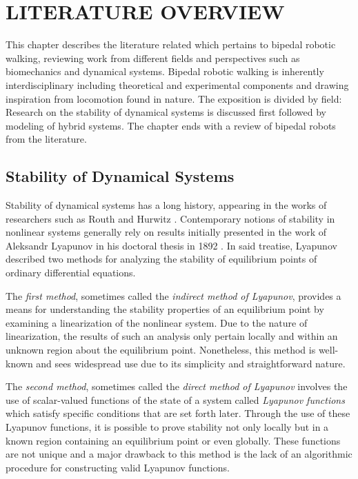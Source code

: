 \chapter{\uppercase{Literature Overview}}

This chapter describes the literature related which pertains to bipedal robotic
walking, reviewing work from different fields and perspectives such as
biomechanics and dynamical systems.
%
Bipedal robotic walking is inherently interdisciplinary including theoretical
and experimental components and drawing inspiration from locomotion found in
nature.
%
The exposition is divided by field:
%
Research on the stability of dynamical systems is discussed first followed by
modeling of hybrid systems.
%
The chapter ends with a review of bipedal robots from the literature.

\section{Stability of Dynamical Systems} \label{sec:literature-stability}

Stability of dynamical systems has a long history, appearing in the works of
researchers such as Routh \cite{Routh1877} and Hurwitz \cite{Hurwitz1895}.
%
Contemporary notions of stability in nonlinear systems generally rely on results
initially presented in the work of Aleksandr Lyapunov in his doctoral thesis in
1892 \cite{Lyapunov1992}.
%
In said treatise, Lyapunov described two methods for analyzing the stability of
equilibrium points of ordinary differential equations.

The {\em first method}, sometimes called the {\em indirect method of Lyapunov},
provides a means for understanding the stability properties of an equilibrium
point by examining a linearization of the nonlinear system.
%
Due to the nature of linearization, the results of such an analysis only pertain
locally and within an unknown region about the equilibrium point.
%
Nonetheless, this method is well-known and sees widespread use due to its
simplicity and straightforward nature.
%

The {\em second method}, sometimes called the {\em direct method of Lyapunov}
involves the use of scalar-valued functions of the state of a system called {\em
  Lyapunov functions} which satisfy specific conditions that are set forth
later.
%
Through the use of these Lyapunov functions, it is possible to prove
stability not only locally but in a known region containing an equilibrium point
or even globally.
%
These functions are not unique and a major drawback to this method is the lack
of an algorithmic procedure for constructing valid Lyapunov functions.

